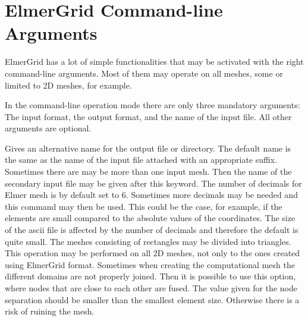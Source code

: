\section{ElmerGrid Command-line Arguments}

ElmerGrid has a lot of simple functionalities that may be activated 
with the right command-line arguments. Most of them may operate on
all meshes, some or limited to 2D meshes, for example. 

In the command-line operation mode
there are only three mandatory arguments: The input format,
the output format, and the name of the input file.
All other arguments are optional.

\sifbegin
{}
Gives an alternative name for the output file or directory. 
The default name is the same as the name of the input file
attached with an appropriate suffix. 
%
Sometimes there are may be more than one input mesh. 
Then the name of the secondary input file may be given 
after this keyword.
%
The number of decimals for Elmer mesh is by default set to 6.
Sometimes more decimals may be needed and this command may then
be used. This could be the case, for example, if the elements are 
small compared to the absolute values of the coordinates.
The size of the ascii file is affected by the number of 
decimals and therefore the default is quite small.
%
The meshes consisting of rectangles may be divided into 
triangles. This operation may be performed on all 2D meshes, 
not only to the ones created using ElmerGrid format.
%
Sometimes when creating the computational mesh the 
different domains are not properly joined. Then it is possible to 
use this option, where nodes that are close to each other are
fused. The value given for the node separation should be smaller than
the smallest element size. Otherwise there is a risk of ruining the mesh.

